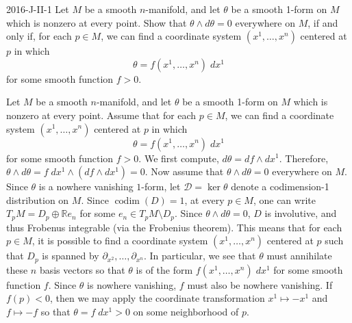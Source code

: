 \documentclass{article}
\begin{document}
	\begin{prb}{2016-J-II-1}
		Let $M$ be a smooth $n$-manifold, and let $\theta$ be a smooth 1-form on $M$ which is nonzero at every point. Show that $\theta \wedge d\theta = 0$ everywhere on $M$, if and only if, for each $p \in M$, we can find a coordinate system $(x^{1}, \ldots, x^{n})$ centered at $p$ in which 
		\begin{equation*}
			\theta = f(x^{1}, \ldots, x^{n})\;dx^{1}
		\end{equation*}
		for some smooth function $f > 0$. 
	\end{prb}
	Let $M$ be a smooth $n$-manifold, and let $\theta$ be a smooth 1-form on $M$ which is nonzero at every point. Assume that for each $p \in M$, we can find a coordinate system $(x^{1}, \ldots, x^{n})$ centered at $p$ in which 
	\begin{equation*}
		\theta = f(x^{1}, \ldots, x^{n})\;dx^{1}
	\end{equation*}
	for some smooth function $f > 0$. We first compute, $d\theta = df  \wedge dx^{1}$. Therefore, $\theta \wedge d\theta = f\;dx^{1} \wedge (df \wedge dx^{1}) = 0$. Now assume that $\theta \wedge d\theta = 0$ everywhere on $M$. Since $\theta$ is a nowhere vanishing $1$-form, let $\mathscr{D} = \ker{\theta}$ denote a codimension-1 distribution on $M$. Since $\operatorname{codim}(D) = 1$, at every $p \in M$, one can write $T_{p}M = D_{p} \oplus \mathbb{R}e_{n}$ for some $e_{n} \in T_{p}M \setminus D_{p}$. Since $\theta \wedge d\theta = 0$, $D$ is involutive, and thus Frobenus integrable (via the Frobenius theorem). This means that for each $p \in M$, it is possible to find a coordinate system $(x^{1}, \ldots, x^{n})$ centered at $p$ such that $D_{p}$ is spanned by $\partial_{x^{2}}, \ldots, \partial_{x^{n}}$. In particular, we see that $\theta$ must annihilate these $n$ basis vectors so that $\theta$ is of the form $f(x^{1}, \ldots, x^{n})\;dx^{1}$ for some smooth function $f$. Since $\theta$ is nowhere vanishing, $f$ must also be nowhere vanishing. If $f(p) < 0$, then we may apply the coordinate transformation $x^{1} \mapsto -x^{1}$ and $f \mapsto -f$ so that $\theta = f\;dx^{1} > 0$ on some neighborhood of $p$. 
	
\end{document}
